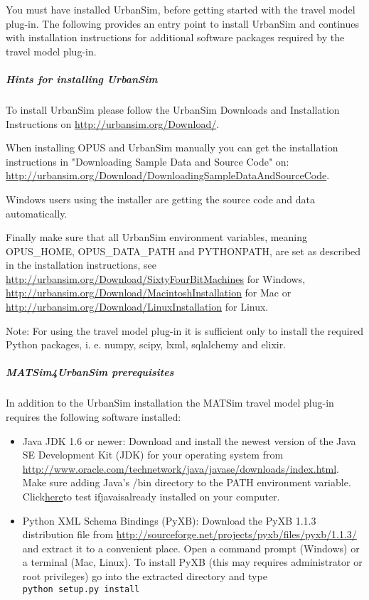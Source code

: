 \documentclass[a4paper,11pt]{report}
\begin{document}
You must have installed UrbanSim, before getting started with the  travel model plug-in. The following provides an entry point to install  UrbanSim and continues with installation instructions for additional  software packages required by the travel model plug-in.

\subparagraph{Hints for installing UrbanSim}

To install UrbanSim please follow the UrbanSim Downloads and Installation Instructions on \href{http://urbansim.org/Download/}{http://urbansim.org/Download/}.

When installing OPUS and UrbanSim manually you can get the  installation instructions in "Downloading Sample Data and Source Code"  on: \href{http://urbansim.org/Download/DownloadingSampleDataAndSourceCode}{http://urbansim.org/Download/DownloadingSampleDataAndSourceCode}.

Windows users using the installer are getting the source code and data automatically.

Finally make sure that all UrbanSim environment variables, meaning  OPUS\_HOME, OPUS\_DATA\_PATH and PYTHONPATH, are set as described in the  installation instructions, see \href{http://urbansim.org/Download/SixtyFourBitMachines}{http://urbansim.org/Download/SixtyFourBitMachines} for Windows, \href{http://urbansim.org/Download/MacintoshInstallation}{http://urbansim.org/Download/MacintoshInstallation} for Mac or \href{http://urbansim.org/Download/LinuxInstallation}{http://urbansim.org/Download/LinuxInstallation} for Linux.

Note:  For using the travel model plug-in it is sufficient only to install the  required Python packages, i. e. numpy, scipy, lxml, sqlalchemy and  elixir.

\subparagraph{MATSim4UrbanSim prerequisites}

In addition to the UrbanSim installation the MATSim travel model plug-in requires the following software installed:
\begin{itemize}
	\item Java JDK 1.6 or newer: Download and install the newest version  of the Java SE Development Kit (JDK) for your operating system from \href{http://www.oracle.com/technetwork/java/javase/downloads/index.html}{http://www.oracle.com/technetwork/java/javase/downloads/index.html}. Make sure adding Java's /bin directory to the PATH environment variable. Click\href{http://java.com/en/download/testjava.jsp}{here}to test ifjavaisalready installed on your computer.
	\item Python XML Schema Bindings (PyXB): Download the PyXB 1.1.3 distribution file from \href{http://sourceforge.net/projects/pyxb/files/pyxb/1.1.3/}{http://sourceforge.net/projects/pyxb/files/pyxb/1.1.3/}  and extract it to a convenient place. Open a command prompt (Windows)  or a terminal (Mac, Linux). To install PyXB (this may requires  administrator or root privileges) go into the extracted directory and  type
\\


\texttt{python setup.py install}
\end{itemize}
\end{document}
